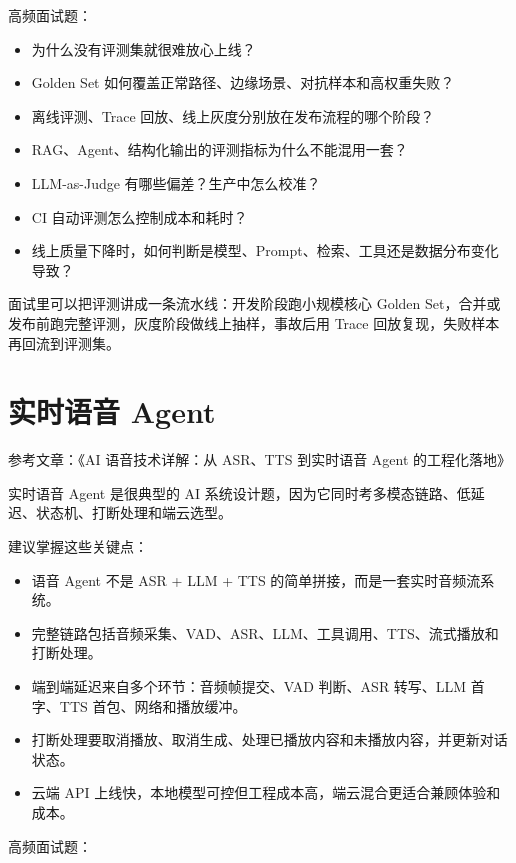 \documentclass[9pt,a4paper,twocolumn]{ctexart}
\begin{document}
高频面试题：


\begin{itemize}[itemsep=1pt, topsep=2pt]
  \item 为什么没有评测集就很难放心上线？
  \item Golden Set 如何覆盖正常路径、边缘场景、对抗样本和高权重失败？
  \item 离线评测、Trace 回放、线上灰度分别放在发布流程的哪个阶段？
  \item RAG、Agent、结构化输出的评测指标为什么不能混用一套？
  \item LLM-as-Judge 有哪些偏差？生产中怎么校准？
  \item CI 自动评测怎么控制成本和耗时？
  \item 线上质量下降时，如何判断是模型、Prompt、检索、工具还是数据分布变化导致？
\end{itemize}


面试里可以把评测讲成一条流水线：开发阶段跑小规模核心 Golden Set，合并或发布前跑完整评测，灰度阶段做线上抽样，事故后用 Trace 回放复现，失败样本再回流到评测集。



\section*{实时语音 Agent}


参考文章：《AI 语音技术详解：从 ASR、TTS 到实时语音 Agent 的工程化落地》



实时语音 Agent 是很典型的 AI 系统设计题，因为它同时考多模态链路、低延迟、状态机、打断处理和端云选型。



建议掌握这些关键点：


\begin{itemize}[itemsep=1pt, topsep=2pt]
  \item 语音 Agent 不是 ASR + LLM + TTS 的简单拼接，而是一套实时音频流系统。
  \item 完整链路包括音频采集、VAD、ASR、LLM、工具调用、TTS、流式播放和打断处理。
  \item 端到端延迟来自多个环节：音频帧提交、VAD 判断、ASR 转写、LLM 首字、TTS 首包、网络和播放缓冲。
  \item 打断处理要取消播放、取消生成、处理已播放内容和未播放内容，并更新对话状态。
  \item 云端 API 上线快，本地模型可控但工程成本高，端云混合更适合兼顾体验和成本。
\end{itemize}


高频面试题：
\end{document}
